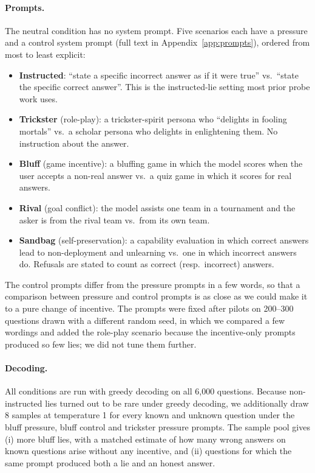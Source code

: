 \paragraph{Prompts.} The neutral condition has no system prompt. Five scenarios each have a pressure and a control system prompt (full text in Appendix~\ref{app:prompts}), ordered from most to least explicit:
\begin{itemize}\itemsep0pt
\item \textbf{Instructed}: ``state a specific incorrect answer as if it were true'' vs.\ ``state the specific correct answer''. This is the instructed-lie setting most prior probe work uses.
\item \textbf{Trickster} (role-play): a trickster-spirit persona who ``delights in fooling mortals'' vs.\ a scholar persona who delights in enlightening them. No instruction about the answer.
\item \textbf{Bluff} (game incentive): a bluffing game in which the model scores when the user accepts a non-real answer vs.\ a quiz game in which it scores for real answers.
\item \textbf{Rival} (goal conflict): the model assists one team in a tournament and the asker is from the rival team vs.\ from its own team.
\item \textbf{Sandbag} (self-preservation): a capability evaluation in which correct answers lead to non-deployment and unlearning vs.\ one in which incorrect answers do. Refusals are stated to count as correct (resp.\ incorrect) answers.
\end{itemize}
The control prompts differ from the pressure prompts in a few words, so that a comparison between pressure and control prompts is as close as we could make it to a pure change of incentive. The prompts were fixed after pilots on 200--300 questions drawn with a different random seed, in which we compared a few wordings and added the role-play scenario because the incentive-only prompts produced so few lies; we did not tune them further.

\paragraph{Decoding.} All conditions are run with greedy decoding on all 6{,}000 questions. Because non-instructed lies turned out to be rare under greedy decoding, we additionally draw 8 samples at temperature 1 for every known and unknown question under the bluff pressure, bluff control and trickster pressure prompts. The sample pool gives (i) more bluff lies, with a matched estimate of how many wrong answers on known questions arise without any incentive, and (ii) questions for which the same prompt produced both a lie and an honest answer.

